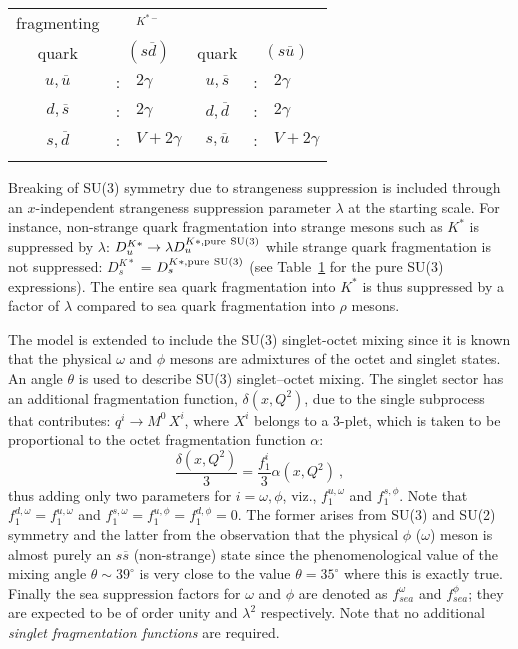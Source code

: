 \documentclass{ws-ijmpa}
\def\lm{{\lambda}}
\begin{document}
\begin{table}[tbh]
{\begin{tabular}{ccl|ccl}
fragmenting & \multicolumn{2}{c}{${{}_{\displaystyle K^{*-}}}$} \\
quark & \multicolumn{2}{c|}{$(s \overline{d})$} & quark &
\multicolumn{2}{c}{$(s \overline{u})$} \\  \colrule
$u, \overline{u}$ & : & $2 {\gamma}$ &
$u, \overline{s}$ & : & $2 {\gamma}$ \\
$d, \overline{s}$ & : & $2 {\gamma}$ &
$d, \overline{d}$ & : & $2 {\gamma}$ \\
$s, \overline{d}$ & : & ${V} + 2 {\gamma}$ &
$s, \overline{u}$ & : & ${V} + 2 {\gamma}$ \\ \botrule
\end{tabular}
\label{tab:frag}}
\end{table}

Breaking of SU(3) symmetry due to strangeness suppression is included
through an $x$-independent strangeness suppression parameter $\lm$ at
the starting scale. For instance, non-strange quark fragmentation into
strange mesons such as $K^*$ is suppressed by $\lambda$: $D_u^{K*} \to
\lambda D_u^{K*, {\rm pure~SU(3)}}$ while strange quark fragmentation
is not suppressed: $D_s^{K*}$ = $D_s^{K*, {\rm pure~SU(3)}}$ (see
Table~\ref{tab:frag} for the pure SU(3) expressions). The entire sea quark
fragmentation into $K^*$ is thus suppressed by a factor of $\lambda$
compared to sea quark fragmentation into $\rho$ mesons.

The model is extended to include the SU(3) singlet-octet mixing since it
is known that the physical $\omega$ and $\phi$ mesons are admixtures of
the octet and singlet states. An angle $\theta$ is used to describe SU(3)
singlet--octet mixing. The singlet sector has an additional fragmentation
function, $\delta(x, Q^2)$, due to the single subprocess that contributes:
$q^i \to M^0 \, X^i$, where $X^i$ belongs to a 3-plet, which is taken
to be proportional to the octet fragmentation function $\alpha$:
$$
\frac{\delta(x, Q^2)}{3} = \frac{f_1^i}{3} \alpha(x, Q^2)~,
$$
thus adding only two parameters for $i = \omega, \phi$, viz., $f_1^{u,
\omega}$ and $f_1^{s, \phi}$. Note that
$f_1^{d,\omega}= f_1^{u,\omega}$ and
$f_1^{s,\omega}= f_1^{u,\phi} = f_1^{d,\phi} = 0$. The former arises from
SU(3) and SU(2) symmetry and the latter from the observation that the
physical $\phi$ ($\omega$) meson is almost purely an $s\overline{s}$
(non-strange) state since the phenomenological value of the mixing angle
$\theta \sim 39^\circ$ is very close to the value $\theta = 35^\circ$
where this is exactly true. Finally the sea suppression factors for
$\omega$ and $\phi$ are denoted as $f_{sea}^\omega$ and $f_{sea}^\phi$;
they are expected to be of order unity and $\lambda^2$ respectively. Note
that no additional {\emph {singlet fragmentation functions}} are required.
\end{document}
